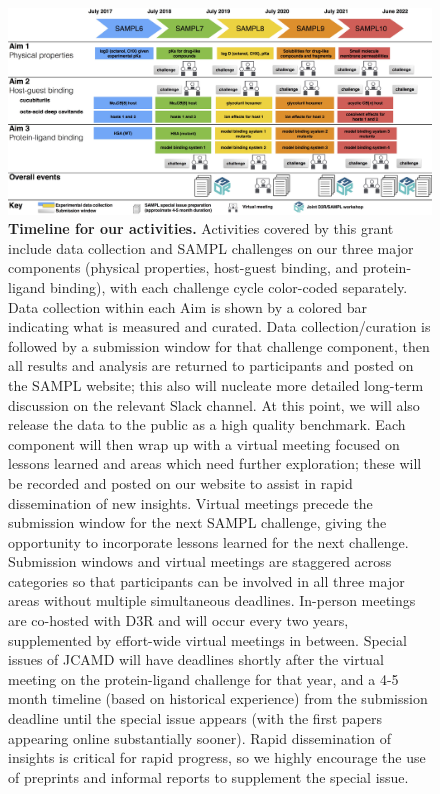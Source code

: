 \documentclass[11pt]{article}
\begin{document}
\begin{figure}[h]
\vspace{-0.10in}
\begin{centering}
\includegraphics[width=\textwidth]{figures/Timeline3_cropped.pdf}
\end{centering}
\vspace{-0.25in}
\caption{\footnotesize {\bf Timeline for our activities.} Activities covered by this grant include data collection and SAMPL challenges on our three major components (physical properties, host-guest binding, and protein-ligand binding), with each challenge cycle color-coded separately.  
Data collection within each Aim is shown by a colored bar indicating what is measured and curated.
Data collection/curation is followed by a submission window for that challenge component, then all results and analysis are returned to participants and posted on the SAMPL website; this also will nucleate more detailed long-term discussion on the relevant Slack channel.
At this point, we will also release the data to the public as a high quality benchmark.
Each component will then wrap up with a virtual meeting focused on lessons learned and areas which need further exploration; these will be recorded and posted on our website to assist in rapid dissemination of new insights. 
Virtual meetings precede the submission window for the next SAMPL challenge, giving the opportunity to incorporate lessons learned for the next challenge.
Submission windows and virtual meetings are staggered across categories so that participants can be involved in all three major areas without multiple simultaneous deadlines.
In-person meetings are co-hosted with D3R and will occur every two years, supplemented by effort-wide virtual meetings in between.
Special issues of JCAMD will have deadlines shortly after the virtual meeting on the protein-ligand challenge for that year, and a 4-5 month timeline (based on historical experience) from the submission deadline until the special issue appears (with the first papers appearing online substantially sooner).
Rapid dissemination of insights is critical for rapid progress, so we highly encourage the use of preprints and informal reports to supplement the special issue.
\vspace{-0.1in}
\label{figure:timeline}}
\end{figure}
\end{document}

